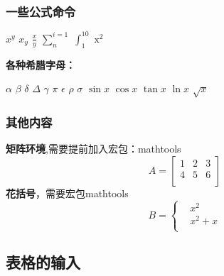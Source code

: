 \documentclass[UTF8]{ctexart}
\begin{document}
    \subsubsection{一些公式命令}
    $x^{y}$ \qquad%
    $x_{y}$ \qquad%
    $\frac{x}{y}$ \qquad%
    $\sum_{n}^{i=1}$ \qquad%
    $\int_{1}^{10}$ \qquad %
    $\mathrm{x^2}$ \qquad%
    
    \textbf{各种希腊字母：}
    
    $\alpha$ \qquad
    $\beta$ \qquad
    $\delta$ \qquad
    $\Delta$ \qquad
    $\gamma$ \qquad
    $\pi$ \qquad
    $\epsilon$ \qquad
    $\rho$ \qquad
    $\sigma$ \qquad
    $\sin{x}$ \qquad
    $\cos{x}$ \qquad
    $\tan{x}$ \qquad
    $\ln{x}$ \qquad
    $\sqrt{x}$ 
    
    \subsubsection{其他内容}
    \textbf{矩阵环境},需要提前加入宏包：mathtools
    	\begin{equation*}
    	A=\begin{bmatrix}
    	    1&2&3\\
    	    4&5&6\\
    	\end{bmatrix}
    	\end{equation*}
    \textbf{花括号}，需要宏包mathtools
    \begin{equation*}
    	B=\begin{cases}
    	&x^2\\
    	&x^2+x\\
    	\end{cases}
    \end{equation*}
    
    \subsection{表格的输入}
    
    
\end{document}
